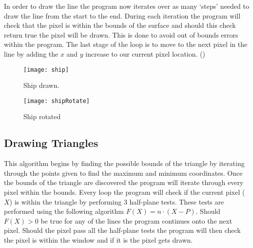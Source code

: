 \documentclass[
	letterpaper, %
	10pt, %
]{CSUniSchoolLabReport}
\begin{document}
\begin{flushleft}
	In order to draw the line the program now iterates over as many `steps'
	needed to draw the line from the start to the end. During each iteration
	the program will check that the pixel is within the bounds of the surface
	and should this check return true the pixel will be drawn. This is done to 
	avoid out of bounds errors within the program. The last stage of the loop is 
	to move to the next pixel in the line by adding the \(x\) and \(y\) increase 
	to our current pixel location. (\cite{Pradhan:2023})
\end{flushleft}



\begin{figure}[H]
	\centering
	\begin{minipage}[b]{0.4\textwidth}
		\texttt{[image: ship]}
		\caption{Ship drawn.}
	\end{minipage}
	\hfill
	\begin{minipage}[b]{0.4\textwidth}
		\texttt{[image: shipRotate]}
		\caption{Ship rotated}
  	\end{minipage}
\end{figure}

\subsection{Drawing Triangles}
\begin{flushleft}
	This algorithm begins by finding the possible bounds of the triangle by 
	iterating through the points given to find the maximum and minimum coordinates. 
	Once the bounds of the triangle are discovered the program will iterate 
	through every pixel within the bounds. Every loop the program will check 
	if the current pixel (\(X\)) is within the triangle by performing 3 half-plane tests.
	These tests are performed using the following algorithm \(F(X)=n \cdot (X - P)\).
	Should \(F(X) > 0\) be true for any of the lines the program continues onto 
	the next pixel. Should the pixel pass all the half-plane tests the program will 
	then check the pixel is within the window and if it is the pixel gets drawn. 

\end{flushleft}
\end{document}
